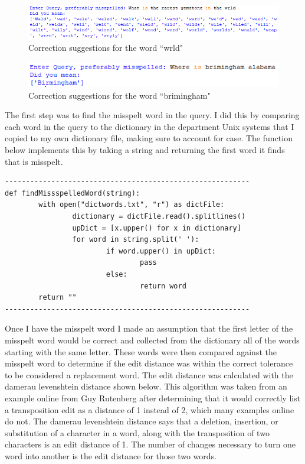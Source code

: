 \documentclass[letterpaper,12pt]{article}
\begin{document}
\begin{figure}[h]
\centering
\includegraphics[scale=0.75]{data/62example1.png}
\caption{Correction suggestions for the word ``wrld"}
\label{correctworld}
\end{figure}

\begin{figure}[h]
\centering
\includegraphics[scale=0.75]{data/62example2.png}
\caption{Correction suggestions for the word ``brimingham"}
\label{correct birmingham}
\end{figure}

The first step was to find the misspelt word in the query. I did this by comparing each word in the query to the dictionary in the department Unix systems that I copied to my own dictionary file, making sure to account for case. The function below implements this by taking a string and returning the first word it finds that is misspelt.

\begin{lstlisting}[breaklines]
----------------------------------------------------------
def findMissspelledWord(string):
        with open("dictwords.txt", "r") as dictFile:
                dictionary = dictFile.read().splitlines()
                upDict = [x.upper() for x in dictionary]
                for word in string.split(' '):
                        if word.upper() in upDict:
                                pass
                        else:
                                return word
        return ""
----------------------------------------------------------
\end{lstlisting}

Once I have the misspelt word I made an assumption that the first letter of the misspelt word would be correct and collected from the dictionary all of the words starting with the same letter. These words were then compared against the misspelt word to determine if the edit distance was within the correct tolerance to be considered a replacement word. The edit distance was calculated with the damerau levenshtein distance shown below. This algorithm was taken from an example online from Guy Rutenberg after determining that it would correctly list a transposition edit as a distance of 1 instead of 2, which many examples online do not. The damerau levenshtein distance says that a deletion, insertion, or substitution of a character in a word, along with the transposition of two characters is an edit distance of 1. The number of changes necessary to turn one word into another is the edit distance for those two words.
\end{document}
